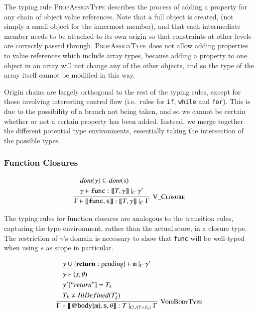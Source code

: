 \documentclass[12pt,a4paper,twoside,openright]{report}
\theoremstyle{definition}
\theoremstyle{dotless}
\newcommand*{\js}{\texttt}
\begin{document}
The typing rule \textsc{PropAssignType} describes the process of adding a
property for any chain of object value references. Note that a full object is
created, (not simply a small object for the innermost member), and that each
intermediate member needs to be attached to its own origin so that constraints
at other levels are correctly passed through. \textsc{PropAssignType} does not
allow adding properties to value references which include array types, because
adding a property to one object in an array will not change any of the other
objects, and so the type of the array itself cannot be modified in this way.

Origin chains are largely orthogonal to the rest of the typing rules, except
for those involving interesting control flow (i.e.~rules for \js{if},
\js{while} and \js{for}). This is due to the possibility of a branch not being
taken, and so we cannot be certain whether or not a certain property has been
added. Instead, we merge together the different potential type environments,
essentially taking the intersection of the possible types.

\subsubsection*{Function Closures}
$$
\infer[\textsc{V\_Closure}]{
  \Gamma\vdash\mathtt{[\![func, s]\!]}: [\![T, \gamma]\!]\ |_C\ \Gamma
}{
  \begin{split}
	&dom(\gamma) \subseteq dom(s) \\
	&\gamma \vdash \mathtt{func} : [\![T, \gamma]\!]\ |_C\ \gamma'
  \end{split}
}$$

The typing rules for function closures are analogous to the transition rules,
capturing the type environment, rather than the actual store, in a closure
type. The restriction of $\gamma$'s domain is necessary to show that \js{func} will be 
well-typed when using $s$ as scope in particular.

$$\infer[\textsc{VoidBodyType}]{
  \Gamma\vdash\mathtt{[\![@body\{m\},s,\theta]\!]}:T\ |_{C\cup\{T=T_k\}}\ \Gamma
}{
  \begin{split}
	&\gamma\cup\{\mathbf{return}:\textrm{pending}\} \vdash \mathtt{m}\ |_C\ \gamma' \\
	&\gamma \vdash (s, \theta) \\
	&\gamma'[``return"] = T_k\\
	&T_k \neq IllDefined(T_k')
  \end{split}
}$$
\end{document}
